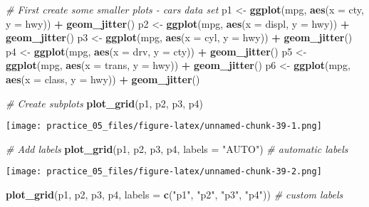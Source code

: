 \documentclass[
]{article}
\newenvironment{Shaded}{\begin{snugshade}}{\end{snugshade}}
\newcommand{\AttributeTok}[1]{\textcolor[rgb]{0.13,0.29,0.53}{#1}}
\newcommand{\CommentTok}[1]{\textcolor[rgb]{0.56,0.35,0.01}{\textit{#1}}}
\newcommand{\FunctionTok}[1]{\textcolor[rgb]{0.13,0.29,0.53}{\textbf{#1}}}
\newcommand{\NormalTok}[1]{#1}
\newcommand{\OtherTok}[1]{\textcolor[rgb]{0.56,0.35,0.01}{#1}}
\newcommand{\SpecialCharTok}[1]{\textcolor[rgb]{0.81,0.36,0.00}{\textbf{#1}}}
\newcommand{\StringTok}[1]{\textcolor[rgb]{0.31,0.60,0.02}{#1}}
\begin{document}
\begin{Shaded}
\begin{Highlighting}[]
\CommentTok{\# First create some smaller plots {-} cars data set}
\NormalTok{p1 }\OtherTok{\textless{}{-}} \FunctionTok{ggplot}\NormalTok{(mpg, }\FunctionTok{aes}\NormalTok{(}\AttributeTok{x =}\NormalTok{ cty, }\AttributeTok{y =}\NormalTok{ hwy))   }\SpecialCharTok{+} \FunctionTok{geom\_jitter}\NormalTok{()}
\NormalTok{p2 }\OtherTok{\textless{}{-}} \FunctionTok{ggplot}\NormalTok{(mpg, }\FunctionTok{aes}\NormalTok{(}\AttributeTok{x =}\NormalTok{ displ, }\AttributeTok{y =}\NormalTok{ hwy)) }\SpecialCharTok{+} \FunctionTok{geom\_jitter}\NormalTok{()}
\NormalTok{p3 }\OtherTok{\textless{}{-}} \FunctionTok{ggplot}\NormalTok{(mpg, }\FunctionTok{aes}\NormalTok{(}\AttributeTok{x =}\NormalTok{ cyl, }\AttributeTok{y =}\NormalTok{ hwy))   }\SpecialCharTok{+} \FunctionTok{geom\_jitter}\NormalTok{()}
\NormalTok{p4 }\OtherTok{\textless{}{-}} \FunctionTok{ggplot}\NormalTok{(mpg, }\FunctionTok{aes}\NormalTok{(}\AttributeTok{x =}\NormalTok{ drv, }\AttributeTok{y =}\NormalTok{ cty))   }\SpecialCharTok{+} \FunctionTok{geom\_jitter}\NormalTok{()}
\NormalTok{p5 }\OtherTok{\textless{}{-}} \FunctionTok{ggplot}\NormalTok{(mpg, }\FunctionTok{aes}\NormalTok{(}\AttributeTok{x =}\NormalTok{ trans, }\AttributeTok{y =}\NormalTok{ hwy)) }\SpecialCharTok{+} \FunctionTok{geom\_jitter}\NormalTok{()}
\NormalTok{p6 }\OtherTok{\textless{}{-}} \FunctionTok{ggplot}\NormalTok{(mpg, }\FunctionTok{aes}\NormalTok{(}\AttributeTok{x =}\NormalTok{ class, }\AttributeTok{y =}\NormalTok{ hwy)) }\SpecialCharTok{+} \FunctionTok{geom\_jitter}\NormalTok{()}

\CommentTok{\# Create subplots}
\FunctionTok{plot\_grid}\NormalTok{(p1, p2, p3, p4)}
\end{Highlighting}
\end{Shaded}

\texttt{[image: practice\_05\_files/figure-latex/unnamed-chunk-39-1.png]}

\begin{Shaded}
\begin{Highlighting}[]
\CommentTok{\#   Add labels }
\FunctionTok{plot\_grid}\NormalTok{(p1, p2, p3, p4, }\AttributeTok{labels =} \StringTok{"AUTO"}\NormalTok{) }\CommentTok{\# automatic labels}
\end{Highlighting}
\end{Shaded}

\texttt{[image: practice\_05\_files/figure-latex/unnamed-chunk-39-2.png]}

\begin{Shaded}
\begin{Highlighting}[]
\FunctionTok{plot\_grid}\NormalTok{(p1, p2, p3, p4, }\AttributeTok{labels =} \FunctionTok{c}\NormalTok{(}\StringTok{"p1"}\NormalTok{, }\StringTok{"p2"}\NormalTok{, }\StringTok{"p3"}\NormalTok{, }\StringTok{"p4"}\NormalTok{)) }\CommentTok{\# custom labels}
\end{Highlighting}
\end{Shaded}
\end{document}
